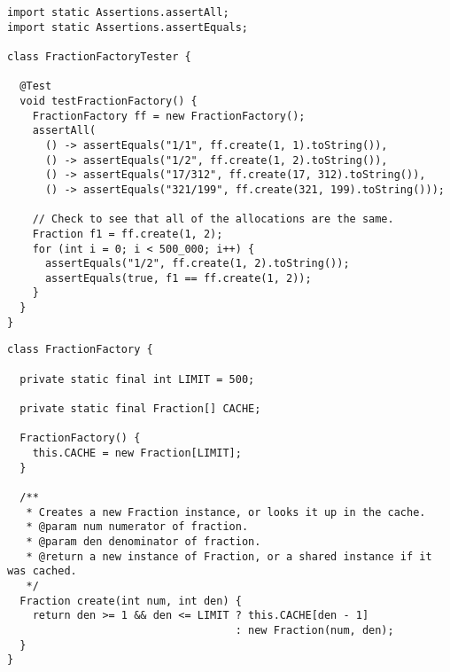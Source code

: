 \begin{cl}{}
\begin{lstlisting}[language=MyJava]
import static Assertions.assertAll;
import static Assertions.assertEquals;

class FractionFactoryTester {

  @Test
  void testFractionFactory() {
    FractionFactory ff = new FractionFactory();
    assertAll(
      () -> assertEquals("1/1", ff.create(1, 1).toString()),
      () -> assertEquals("1/2", ff.create(1, 2).toString()),
      () -> assertEquals("17/312", ff.create(17, 312).toString()),
      () -> assertEquals("321/199", ff.create(321, 199).toString()));

    // Check to see that all of the allocations are the same.
    Fraction f1 = ff.create(1, 2);
    for (int i = 0; i < 500_000; i++) {
      assertEquals("1/2", ff.create(1, 2).toString());
      assertEquals(true, f1 == ff.create(1, 2));
    }
  }
}
\end{lstlisting}
\end{cl}

\begin{cl}{}
\begin{lstlisting}[language=MyJava]
class FractionFactory {

  private static final int LIMIT = 500;
  
  private static final Fraction[] CACHE;

  FractionFactory() {
    this.CACHE = new Fraction[LIMIT];
  }

  /**
   * Creates a new Fraction instance, or looks it up in the cache.
   * @param num numerator of fraction.
   * @param den denominator of fraction.
   * @return a new instance of Fraction, or a shared instance if it was cached.
   */
  Fraction create(int num, int den) {
    return den >= 1 && den <= LIMIT ? this.CACHE[den - 1] 
                                    : new Fraction(num, den);
  }
}
\end{lstlisting}
\end{cl}


